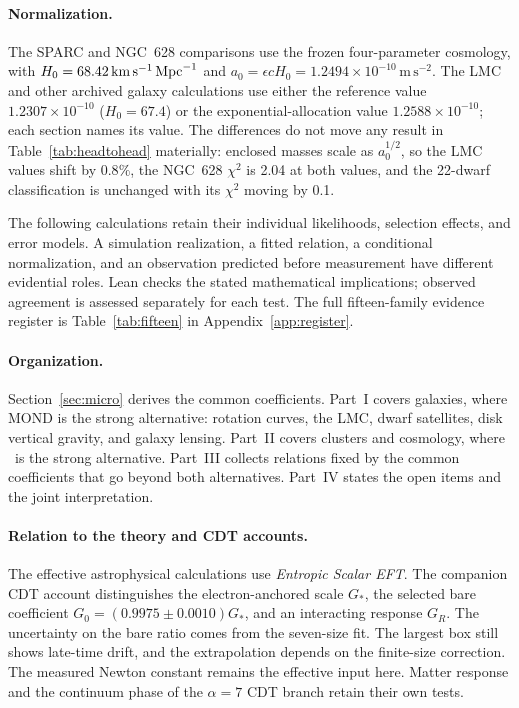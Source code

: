 \paragraph{Normalization.}
The SPARC and NGC~628 comparisons use the frozen four-parameter cosmology,
with $H_0=68.42\,\mathrm{km\,s^{-1}}\,\mathrm{Mpc}^{-1}$ and
$a_0=\epsilon cH_0=1.2494\times10^{-10}\,\mathrm{m\,s^{-2}}$.
The LMC and other archived galaxy calculations use either the reference value
$1.2307\times10^{-10}$ ($H_0=67.4$) or the exponential-allocation
value $1.2588\times10^{-10}$; each section names its value. The
differences do not move any result in Table~\ref{tab:headtohead}
materially: enclosed masses scale as $a_0^{1/2}$, so the LMC values shift
by $0.8\%$, the NGC~628 $\chi^2$ is 2.04 at both values, and the 22-dwarf
classification is unchanged with its $\chi^2$ moving by 0.1.

The following calculations retain their individual likelihoods,
selection effects, and error models. A simulation realization, a fitted
relation, a conditional normalization, and an observation predicted
before measurement have different evidential roles. Lean checks the
stated mathematical implications; observed agreement is assessed
separately for each test. The full fifteen-family evidence register is
Table~\ref{tab:fifteen} in Appendix~\ref{app:register}.

\paragraph{Organization.}
Section~\ref{sec:micro} derives the common coefficients. Part~I covers
galaxies, where MOND is the strong alternative: rotation curves, the LMC,
dwarf satellites, disk vertical gravity, and galaxy lensing. Part~II
covers clusters and cosmology, where \LCDM\ is the strong alternative.
Part~III collects relations fixed by the common coefficients that go
beyond both alternatives. Part~IV states the open items and the joint
interpretation.

\paragraph{Relation to the theory and CDT accounts.}
The effective astrophysical calculations use \emph{Entropic Scalar EFT}.
The companion CDT account distinguishes the electron-anchored scale
$G_*$, the selected bare coefficient $G_0=(0.9975\pm0.0010)G_*$, and an
interacting response $G_R$. The uncertainty on the bare ratio comes from the seven-size fit. The largest box still shows late-time drift, and the extrapolation depends on the finite-size correction. The measured Newton constant remains the
effective input here. Matter response and the continuum phase of the
$\alpha=7$ CDT branch retain their own tests. 

